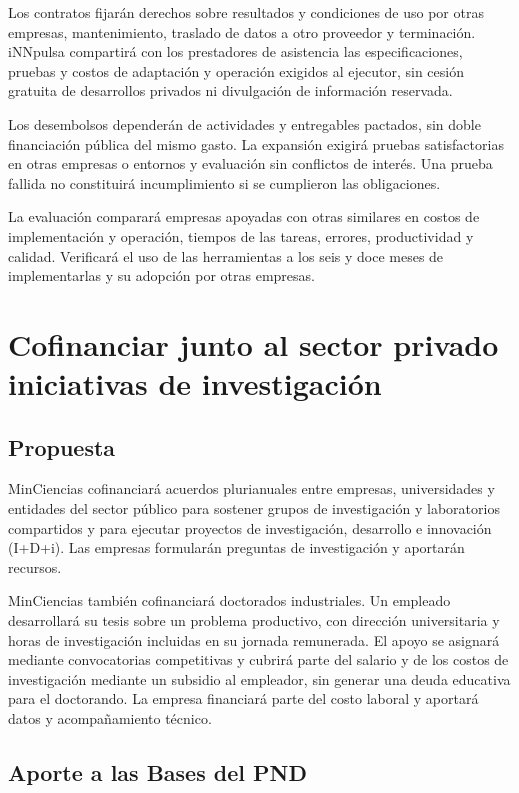 Los contratos fijarán derechos sobre resultados y condiciones de uso por otras empresas, mantenimiento, traslado de datos a otro proveedor y terminación. iNNpulsa compartirá con los prestadores de asistencia las especificaciones, pruebas y costos de adaptación y operación exigidos al ejecutor, sin cesión gratuita de desarrollos privados ni divulgación de información reservada.

Los desembolsos dependerán de actividades y entregables pactados, sin doble financiación pública del mismo gasto. La expansión exigirá pruebas satisfactorias en otras empresas o entornos y evaluación sin conflictos de interés. Una prueba fallida no constituirá incumplimiento si se cumplieron las obligaciones.

La evaluación comparará empresas apoyadas con otras similares en costos de implementación y operación, tiempos de las tareas, errores, productividad y calidad. Verificará el uso de las herramientas a los seis y doce meses de implementarlas y su adopción por otras empresas.

\section{Cofinanciar junto al sector privado iniciativas de investigación}
\label{prop:2}

\subsection{Propuesta}

MinCiencias cofinanciará acuerdos plurianuales entre empresas, universidades y entidades del sector público para sostener grupos de investigación y laboratorios compartidos y para ejecutar proyectos de investigación, desarrollo e innovación (I+D+i). Las empresas formularán preguntas de investigación y aportarán recursos.

MinCiencias también cofinanciará doctorados industriales. Un empleado desarrollará su tesis sobre un problema productivo, con dirección universitaria y horas de investigación incluidas en su jornada remunerada. El apoyo se asignará mediante convocatorias competitivas y cubrirá parte del salario y de los costos de investigación mediante un subsidio al empleador, sin generar una deuda educativa para el doctorando. La empresa financiará parte del costo laboral y aportará datos y acompañamiento técnico.

\subsection{Aporte a las Bases del PND}

